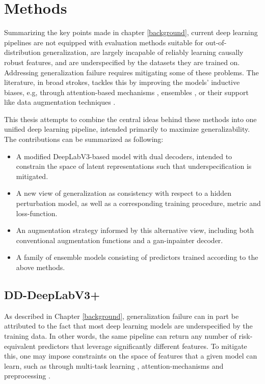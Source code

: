 \chapter{Methods}\label{methods}
Summarizing the key points made in chapter \ref{background}, current deep learning pipelines are not equipped with evaluation methods suitable for out-of-distribution generalization, are largely incapable of reliably learning causally robust features, and are underspecified by the datasets they are trained on. Addressing generalization failure requires mitigating some of these problems. The literature, in broad strokes, tackles this by improving the models' inductive biases, e.g, through attention-based mechanisms \cite{attention_generalizability, reverse_attention}, ensembles \cite{divergentnets, endoensemble}, or their support like data augmentation techniques \cite{polyp_augmentation, cyclegan}. 

This thesis attempts to combine the central ideas behind these methods into one unified deep learning pipeline, intended primarily to maximize generalizability. The contributions can be summarized as following:

\begin{itemize}
    \item A modified DeepLabV3-based model with dual decoders, intended to constrain the space of latent representations such that underspecification is mitigated.
    \item A new view of generalization as consistency with respect to a hidden perturbation model, as well as a corresponding training procedure, metric and loss-function.
    \item An augmentation strategy informed by this alternative view, including both conventional augmentation functions and a \gls{gan}-inpainter decoder.
    \item A family of ensemble models consisting of predictors trained according to the above methods.
\end{itemize}

\section{DD-DeepLabV3+}
As described in Chapter \ref{background}, generalization failure can in part be attributed to the fact that most deep learning models are underspecified by the training data. In other words, the same pipeline can return any number of risk-equivalent predictors that leverage significantly different features. To mitigate this, one may impose constraints on the space of features that a given model can learn, such as through multi-task learning \cite{ddanet}, attention-mechanisms \cite{attention_generalizability, reverse_attention} and preprocessing \cite{visual_cortex}. 

